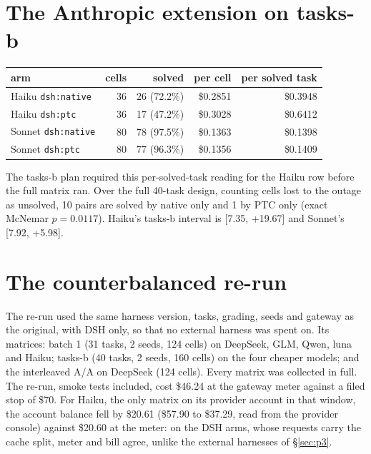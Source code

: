 \documentclass[10pt]{article}
\newcommand*{\mi}{\textminus}   %
\newenvironment{inlinetable}{\par\medskip\noindent\begin{minipage}{\linewidth}\centering\small}{\end{minipage}\par\bigskip}
\begin{document}
\begin{appendices}
\section{The Anthropic extension on tasks-b}\label{app:extension}

\begin{inlinetable}
\label{tab:extension}
\begin{tabular}{@{}lrrrr@{}}
\toprule
arm & cells & solved & per cell & per solved task \\
\midrule
Haiku \texttt{dsh:native} & 36 & 26 (72.2\%) & \$0.2851 & \$0.3948 \\
Haiku \texttt{dsh:ptc} & 36 & 17 (47.2\%) & \$0.3028 & \$0.6412 \\
Sonnet \texttt{dsh:native} & 80 & 78 (97.5\%) & \$0.1363 & \$0.1398 \\
Sonnet \texttt{dsh:ptc} & 80 & 77 (96.3\%) & \$0.1356 & \$0.1409 \\
\bottomrule
\end{tabular}
\end{inlinetable}

The tasks-b plan required this per-solved-task reading for the Haiku row before the full matrix ran.
Over the full 40-task design, counting cells lost to the outage as unsolved, 10 pairs are solved by
native only and 1 by PTC only (exact McNemar $p = 0.0117$). Haiku's tasks-b interval is
[\mi{}7.35, +19.67] and Sonnet's [\mi{}7.92, +5.98].

\section{The counterbalanced re-run}\label{app:rerun}

The re-run used the same harness version, tasks, grading, seeds and gateway as the original, with
DSH only, so that no external harness was spent on. Its matrices: batch 1 (31 tasks, 2 seeds, 124
cells) on DeepSeek, GLM, Qwen, luna and Haiku; tasks-b (40 tasks, 2 seeds, 160 cells) on the four
cheaper models; and the interleaved A/A on DeepSeek (124 cells). Every matrix was collected in full.
The re-run, smoke tests included, cost \$46.24 at the gateway meter against a filed stop of \$70. For Haiku, the only
matrix on its provider account in that window, the account balance fell by \$20.61 (\$57.90 to
\$37.29, read from the provider console) against \$20.60 at the meter: on the DSH arms, whose
requests carry the cache split, meter and bill agree, unlike the external harnesses of
\S\ref{sec:p3}.


\end{appendices}
\end{document}
